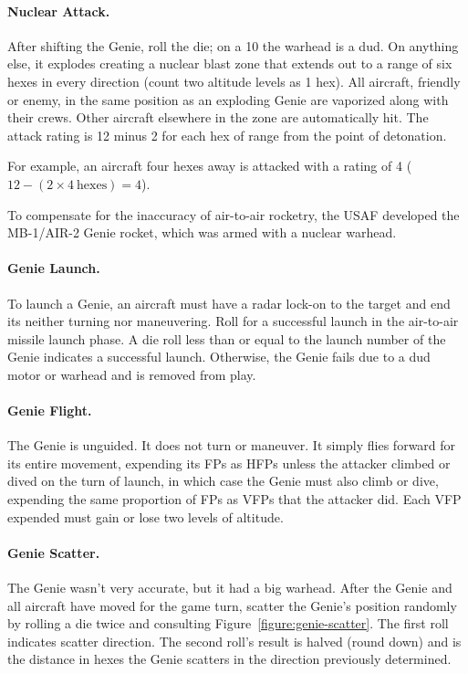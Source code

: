 \begin{advancedrules}
{\paragraph{Nuclear Attack.} After shifting the Genie, roll the die; on a 10 the warhead is a dud. On anything else, it explodes creating a nuclear blast zone that extends out to a range of six hexes in every direction (count two altitude levels as 1 hex). All aircraft, friendly or enemy, in the same position as an exploding Genie are vaporized along with their crews. Other aircraft elsewhere in the zone are automatically hit. The attack rating is 12 minus 2 for each hex of range from the point of detonation.

For example, an aircraft four hexes away is attacked with a rating of 4 ($12 - (2 \times 4\ \mathrm{hexes}) = 4$).
}{

To compensate for the inaccuracy of air-to-air rocketry, the USAF developed the MB-1/AIR-2 Genie rocket, which was armed with a nuclear warhead.

\paragraph{Genie Launch.} To launch a Genie, an aircraft must have a radar lock-on to the target and end its neither turning nor maneuvering. Roll for a successful launch in the air-to-air missile launch phase. A die roll less than or equal to the launch number of the Genie indicates a successful launch. Otherwise, the Genie fails due to a dud motor or warhead and is removed from play.

\paragraph{Genie Flight.} The Genie is unguided. It does not turn or maneuver. It simply flies forward for its entire movement, expending its FPs as HFPs unless the attacker climbed or dived on the turn of launch, in which case the Genie must also climb or dive, expending the same proportion of FPs as VFPs that the attacker did. Each VFP expended must gain or lose two levels of altitude.

\paragraph{Genie Scatter.} The Genie wasn’t very accurate, but it had a big warhead. After the Genie and all aircraft have moved for the game turn, scatter the Genie’s position randomly by rolling a die twice and consulting Figure~\ref{figure:genie-scatter}. The first roll indicates scatter direction. The second roll’s result is halved (round down) and is the distance in hexes the Genie scatters in the direction previously determined.

}
\end{advancedrules}
